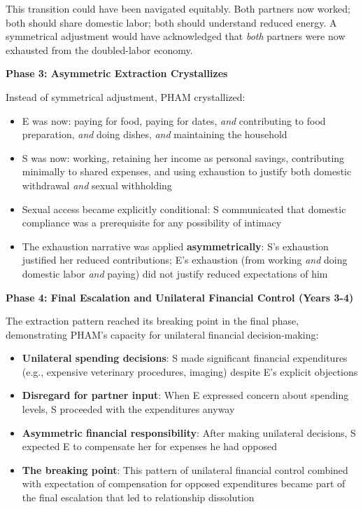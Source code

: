 \documentclass[12pt,openany]{book}
\numberwithin{equation}{chapter}
\begin{document}
This transition could have been navigated equitably. Both partners now worked; both should share domestic labor; both should understand reduced energy. A symmetrical adjustment would have acknowledged that \textit{both} partners were now exhausted from the doubled-labor economy.

\textbf{Phase 3: Asymmetric Extraction Crystallizes}

Instead of symmetrical adjustment, PHAM crystallized:
\begin{itemize}
    \item E was now: paying for food, paying for dates, \textit{and} contributing to food preparation, \textit{and} doing dishes, \textit{and} maintaining the household
    \item S was now: working, retaining her income as personal savings, contributing minimally to shared expenses, and using exhaustion to justify both domestic withdrawal \textit{and} sexual withholding
    \item Sexual access became explicitly conditional: S communicated that domestic compliance was a prerequisite for any possibility of intimacy
    \item The exhaustion narrative was applied \textbf{asymmetrically}: S's exhaustion justified her reduced contributions; E's exhaustion (from working \textit{and} doing domestic labor \textit{and} paying) did not justify reduced expectations of him
\end{itemize}

\textbf{Phase 4: Final Escalation and Unilateral Financial Control (Years 3-4)}

The extraction pattern reached its breaking point in the final phase, demonstrating PHAM's capacity for unilateral financial decision-making:

\begin{itemize}
    \item \textbf{Unilateral spending decisions}: S made significant financial expenditures (e.g., expensive veterinary procedures, imaging) despite E's explicit objections
    \item \textbf{Disregard for partner input}: When E expressed concern about spending levels, S proceeded with the expenditures anyway
    \item \textbf{Asymmetric financial responsibility}: After making unilateral decisions, S expected E to compensate her for expenses he had opposed
    \item \textbf{The breaking point}: This pattern of unilateral financial control combined with expectation of compensation for opposed expenditures became part of the final escalation that led to relationship dissolution
\end{itemize}
\end{document}
